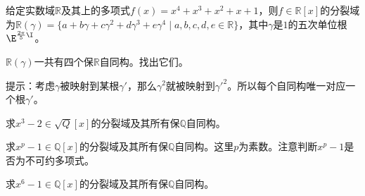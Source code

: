 \begin{exercise}{}
给定实数域$\mathbb{R}$及其上的多项式$f(x)=x^4+x^3+x^2+x+1$，则$f\in\mathbb{R}[x]$的分裂域为$\mathbb{R}(\gamma)=\{a+b\gamma+c\gamma^2+d\gamma^3+e\gamma^4 \mid a, b, c, d, e\in\mathbb{R}\}$，其中$\gamma$是$1$的五次单位根$\E^{\frac{2\pi}{5}\I}$。

$\mathbb{R}(\gamma)$一共有四个保$\mathbb{R}$自同构。找出它们。

提示：考虑$\gamma$被映射到某根$\gamma'$，那么$\gamma^2$就被映射到$\gamma'^2$。所以每个自同构唯一对应一个根$\gamma'$。
\end{exercise}



\begin{exercise}{}\label{SpltFd_exe1}
求$x^3-2\in\sqrt{Q}[x]$的分裂域及其所有保$\mathbb{Q}$自同构。
\end{exercise}



\begin{exercise}{}
求$x^p-1\in\mathbb{Q}[x]$的分裂域及其所有保$\mathbb{Q}$自同构。这里$p$为素数。注意判断$x^p-1$是否为不可约多项式。
\end{exercise}


\begin{exercise}{}
求$x^6-1\in\mathbb{Q}[x]$的分裂域及其所有保$\mathbb{Q}$自同构。
\end{exercise}














